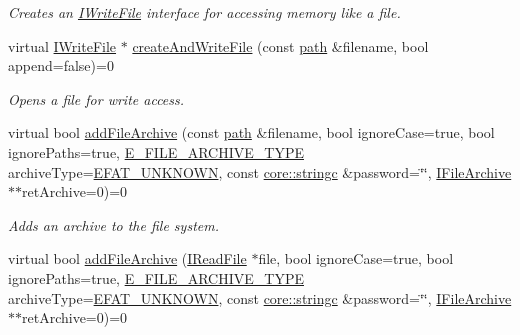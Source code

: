 \begin{DoxyCompactItemize}
\begin{DoxyCompactList}\small\item\em Creates an \hyperlink{classirr_1_1io_1_1IWriteFile}{I\+Write\+File} interface for accessing memory like a file. \end{DoxyCompactList}\item 
virtual \hyperlink{classirr_1_1io_1_1IWriteFile}{I\+Write\+File} $\ast$ \hyperlink{classirr_1_1io_1_1IFileSystem_af0ed28b697936ee8aa60a5a0877ac90a}{create\+And\+Write\+File} (const \hyperlink{namespaceirr_1_1io_a6468281622ce3a1c46b72e19f32dded5}{path} \&filename, bool append=false)=0
\begin{DoxyCompactList}\small\item\em Opens a file for write access. \end{DoxyCompactList}\item 
virtual bool \hyperlink{classirr_1_1io_1_1IFileSystem_afe6641c7f88a8fea0205c113b8379730}{add\+File\+Archive} (const \hyperlink{namespaceirr_1_1io_a6468281622ce3a1c46b72e19f32dded5}{path} \&filename, bool ignore\+Case=true, bool ignore\+Paths=true, \hyperlink{namespaceirr_1_1io_adb3e3c445ec8e608ed1f0f93306da14f}{E\+\_\+\+F\+I\+L\+E\+\_\+\+A\+R\+C\+H\+I\+V\+E\+\_\+\+T\+Y\+PE} archive\+Type=\hyperlink{namespaceirr_1_1io_adb3e3c445ec8e608ed1f0f93306da14fa7a4f7d9873f9705cd6dc73191e7d8359}{E\+F\+A\+T\+\_\+\+U\+N\+K\+N\+O\+WN}, const \hyperlink{namespaceirr_1_1core_ab26a0e0359206b5a694f35c37c829d7f}{core\+::stringc} \&password=\char`\"{}\char`\"{}, \hyperlink{classirr_1_1io_1_1IFileArchive}{I\+File\+Archive} $\ast$$\ast$ret\+Archive=0)=0
\begin{DoxyCompactList}\small\item\em Adds an archive to the file system. \end{DoxyCompactList}\item 
virtual bool \hyperlink{classirr_1_1io_1_1IFileSystem_abe4d01069e7fbf0fa871197a68ad87b9}{add\+File\+Archive} (\hyperlink{classirr_1_1io_1_1IReadFile}{I\+Read\+File} $\ast$file, bool ignore\+Case=true, bool ignore\+Paths=true, \hyperlink{namespaceirr_1_1io_adb3e3c445ec8e608ed1f0f93306da14f}{E\+\_\+\+F\+I\+L\+E\+\_\+\+A\+R\+C\+H\+I\+V\+E\+\_\+\+T\+Y\+PE} archive\+Type=\hyperlink{namespaceirr_1_1io_adb3e3c445ec8e608ed1f0f93306da14fa7a4f7d9873f9705cd6dc73191e7d8359}{E\+F\+A\+T\+\_\+\+U\+N\+K\+N\+O\+WN}, const \hyperlink{namespaceirr_1_1core_ab26a0e0359206b5a694f35c37c829d7f}{core\+::stringc} \&password=\char`\"{}\char`\"{}, \hyperlink{classirr_1_1io_1_1IFileArchive}{I\+File\+Archive} $\ast$$\ast$ret\+Archive=0)=0

\end{DoxyCompactItemize}
